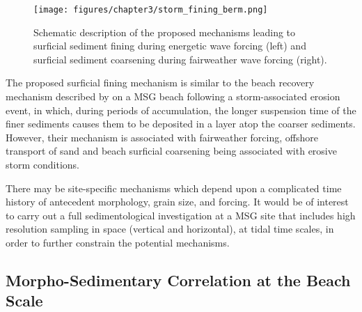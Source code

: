 \begin{figure}[tbp] %
	\begin{center}
		\texttt{[image: figures/chapter3/storm\_fining\_berm.png]}
		\caption[Schematic description of surficial sediment fining mechanisms during energetic wave forcing]{Schematic description of the proposed mechanisms leading to surficial sediment fining during energetic wave forcing (left) and surficial sediment coarsening during fairweather wave forcing (right).}
		\label{fig:storm_fining}
	\end{center}
\end{figure}

The proposed surficial fining mechanism is similar to the beach recovery mechanism described by \citet{Bramato_etal2012} on a MSG beach following a storm-associated erosion event, in which, during periods of accumulation, the longer suspension time of the finer sediments causes them to be deposited in a layer atop the coarser sediments. However, their mechanism is associated with fairweather forcing, offshore transport of sand and beach surficial coarsening being associated with erosive storm conditions.

There may be site-specific mechanisms which depend upon a complicated time history of antecedent morphology, grain size, and forcing. It would be of interest to carry out a full sedimentological investigation at a MSG site that includes high resolution sampling in space (vertical and horizontal), at tidal time scales, in order to further constrain the potential mechanisms.


\subsection{Morpho-Sedimentary Correlation at the Beach Scale}\label{subsection:ChMSDBeach_corrDiscussion}

